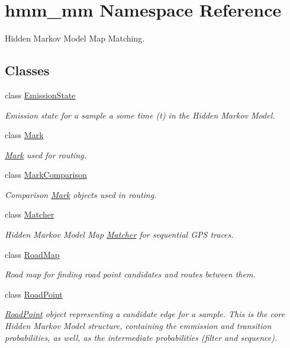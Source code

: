 \hypertarget{namespacehmm__mm}{}\section{hmm\+\_\+mm Namespace Reference}
\label{namespacehmm__mm}


Hidden Markov Model Map Matching.  


\subsection*{Classes}
\begin{DoxyCompactItemize}
\item 
class \hyperlink{classhmm__mm_1_1EmissionState}{Emission\+State}
\begin{DoxyCompactList}\small\item\em Emission state for a sample a some time (t) in the Hidden Markov Model. \end{DoxyCompactList}\item 
class \hyperlink{classhmm__mm_1_1Mark}{Mark}
\begin{DoxyCompactList}\small\item\em \hyperlink{classhmm__mm_1_1Mark}{Mark} used for routing. \end{DoxyCompactList}\item 
class \hyperlink{classhmm__mm_1_1MarkComparison}{Mark\+Comparison}
\begin{DoxyCompactList}\small\item\em Comparison \hyperlink{classhmm__mm_1_1Mark}{Mark} objects used in routing. \end{DoxyCompactList}\item 
class \hyperlink{classhmm__mm_1_1Matcher}{Matcher}
\begin{DoxyCompactList}\small\item\em Hidden Markov Model Map \hyperlink{classhmm__mm_1_1Matcher}{Matcher} for sequential G\+PS traces. \end{DoxyCompactList}\item 
class \hyperlink{classhmm__mm_1_1RoadMap}{Road\+Map}
\begin{DoxyCompactList}\small\item\em Road map for finding road point candidates and routes between them. \end{DoxyCompactList}\item 
class \hyperlink{classhmm__mm_1_1RoadPoint}{Road\+Point}
\begin{DoxyCompactList}\small\item\em \hyperlink{classhmm__mm_1_1RoadPoint}{Road\+Point} object representing a candidate edge for a sample. This is the core Hidden Markov Model structure, containing the emmission and transition probabilities, as well, as the intermediate probabilities (filter and sequence). \end{DoxyCompactList}\item 

\end{DoxyCompactItemize}
